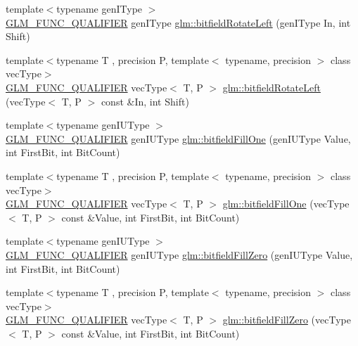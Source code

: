 \begin{DoxyCompactItemize}
\item 
{\footnotesize template$<$typename gen\+I\+Type $>$ }\\\mbox{\hyperlink{setup_8hpp_a33fdea6f91c5f834105f7415e2a64407}{G\+L\+M\+\_\+\+F\+U\+N\+C\+\_\+\+Q\+U\+A\+L\+I\+F\+I\+ER}} gen\+I\+Type \mbox{\hyperlink{namespaceglm_ae088d9983f8cb8fcf0aacae4ae51462a}{glm\+::bitfield\+Rotate\+Left}} (gen\+I\+Type In, int Shift)
\item 
{\footnotesize template$<$typename T , precision P, template$<$ typename, precision $>$ class vec\+Type$>$ }\\\mbox{\hyperlink{setup_8hpp_a33fdea6f91c5f834105f7415e2a64407}{G\+L\+M\+\_\+\+F\+U\+N\+C\+\_\+\+Q\+U\+A\+L\+I\+F\+I\+ER}} vec\+Type$<$ T, P $>$ \mbox{\hyperlink{group__gtc__bitfield_ga410d130917d85b865718e3ebc32cf0ef}{glm\+::bitfield\+Rotate\+Left}} (vec\+Type$<$ T, P $>$ const \&In, int Shift)
\item 
{\footnotesize template$<$typename gen\+I\+U\+Type $>$ }\\\mbox{\hyperlink{setup_8hpp_a33fdea6f91c5f834105f7415e2a64407}{G\+L\+M\+\_\+\+F\+U\+N\+C\+\_\+\+Q\+U\+A\+L\+I\+F\+I\+ER}} gen\+I\+U\+Type \mbox{\hyperlink{group__gtc__bitfield_ga46f9295abe3b5c7658f5b13c7f819f0a}{glm\+::bitfield\+Fill\+One}} (gen\+I\+U\+Type Value, int First\+Bit, int Bit\+Count)
\item 
{\footnotesize template$<$typename T , precision P, template$<$ typename, precision $>$ class vec\+Type$>$ }\\\mbox{\hyperlink{setup_8hpp_a33fdea6f91c5f834105f7415e2a64407}{G\+L\+M\+\_\+\+F\+U\+N\+C\+\_\+\+Q\+U\+A\+L\+I\+F\+I\+ER}} vec\+Type$<$ T, P $>$ \mbox{\hyperlink{group__gtc__bitfield_gad789042e84e8292ae95dc1af856f2ad5}{glm\+::bitfield\+Fill\+One}} (vec\+Type$<$ T, P $>$ const \&Value, int First\+Bit, int Bit\+Count)
\item 
{\footnotesize template$<$typename gen\+I\+U\+Type $>$ }\\\mbox{\hyperlink{setup_8hpp_a33fdea6f91c5f834105f7415e2a64407}{G\+L\+M\+\_\+\+F\+U\+N\+C\+\_\+\+Q\+U\+A\+L\+I\+F\+I\+ER}} gen\+I\+U\+Type \mbox{\hyperlink{group__gtc__bitfield_ga697b86998b7d74ee0a69d8e9f8819fee}{glm\+::bitfield\+Fill\+Zero}} (gen\+I\+U\+Type Value, int First\+Bit, int Bit\+Count)
\item 
{\footnotesize template$<$typename T , precision P, template$<$ typename, precision $>$ class vec\+Type$>$ }\\\mbox{\hyperlink{setup_8hpp_a33fdea6f91c5f834105f7415e2a64407}{G\+L\+M\+\_\+\+F\+U\+N\+C\+\_\+\+Q\+U\+A\+L\+I\+F\+I\+ER}} vec\+Type$<$ T, P $>$ \mbox{\hyperlink{group__gtc__bitfield_gaddba3196316b0bd240295b09b43c2958}{glm\+::bitfield\+Fill\+Zero}} (vec\+Type$<$ T, P $>$ const \&Value, int First\+Bit, int Bit\+Count)

\end{DoxyCompactItemize}
